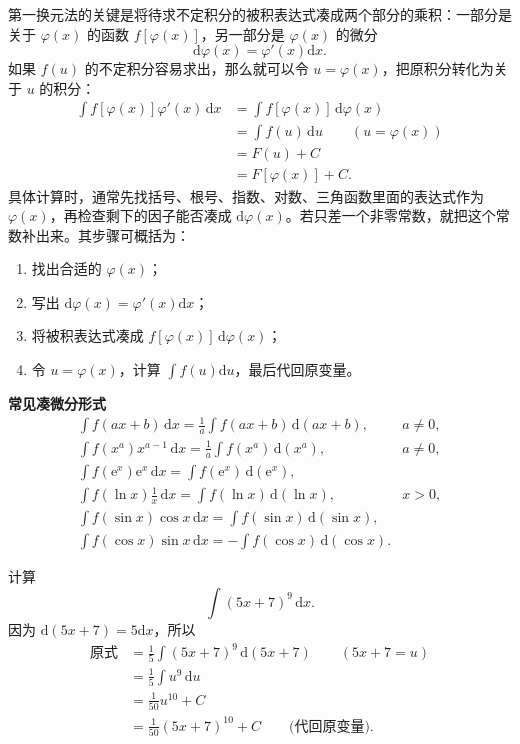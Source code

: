 \documentclass[fontset=fandol]{ctexart}
\newenvironment{custom}[1]{\par\noindent\textbf{#1}\quad}{\par\vspace{0.8em}}
\newcommand{\dd}{\mathrm{d}}
\newcommand{\ee}{\mathrm{e}}
\begin{document}
第一换元法的关键是将待求不定积分的被积表达式凑成两个部分的乘积：一部分是关于 $\varphi(x)$ 的函数 $f[\varphi(x)]$，另一部分是 $\varphi(x)$ 的微分
\[
\dd\varphi(x)=\varphi'(x)\dd x.
\]
如果 $f(u)$ 的不定积分容易求出，那么就可以令 $u=\varphi(x)$，把原积分转化为关于 $u$ 的积分：
\[
\begin{aligned}
\int f[\varphi(x)]\varphi'(x)\,\dd x
&=\int f[\varphi(x)]\,\dd\varphi(x)\\
&=\int f(u)\,\dd u\qquad (u=\varphi(x))\\
&=F(u)+C\\
&=F[\varphi(x)]+C.
\end{aligned}
\]
具体计算时，通常先找括号、根号、指数、对数、三角函数里面的表达式作为 $\varphi(x)$，再检查剩下的因子能否凑成 $\dd\varphi(x)$。若只差一个非零常数，就把这个常数补出来。其步骤可概括为：
\begin{enumerate}
\item 找出合适的 $\varphi(x)$；
\item 写出 $\dd\varphi(x)=\varphi'(x)\dd x$；
\item 将被积表达式凑成 $f[\varphi(x)]\,\dd\varphi(x)$；
\item 令 $u=\varphi(x)$，计算 $\int f(u)\dd u$，最后代回原变量。
\end{enumerate}

\begin{custom}{常见凑微分形式}
\[
\begin{array}{ll}
\displaystyle \int f(ax+b)\,\dd x=\frac1a\int f(ax+b)\,\dd(ax+b), & a\neq0,\\[0.8em]
\displaystyle \int f(x^a)x^{a-1}\,\dd x=\frac1a\int f(x^a)\,\dd(x^a), & a\neq0,\\[0.8em]
\displaystyle \int f(\ee^x)\ee^x\,\dd x=\int f(\ee^x)\,\dd(\ee^x),& \\[0.8em]
\displaystyle \int f(\ln x)\frac1x\,\dd x=\int f(\ln x)\,\dd(\ln x),& x>0,\\[0.8em]
\displaystyle \int f(\sin x)\cos x\,\dd x=\int f(\sin x)\,\dd(\sin x),& \\[0.8em]
\displaystyle \int f(\cos x)\sin x\,\dd x=-\int f(\cos x)\,\dd(\cos x).&
\end{array}
\]
\end{custom}

\begin{example}[线性换元]
计算
\[
\int (5x+7)^9\,\dd x.
\]
因为 $\dd(5x+7)=5\dd x$，所以
\[
\begin{aligned}
\text{原式}
&=\frac15\int (5x+7)^9\,\dd(5x+7)\qquad (5x+7=u)\\
&=\frac15\int u^9\,\dd u\\
&=\frac1{50}u^{10}+C\\
&=\frac1{50}(5x+7)^{10}+C\qquad \text{(代回原变量)}.
\end{aligned}
\]
\end{example}
\end{document}
